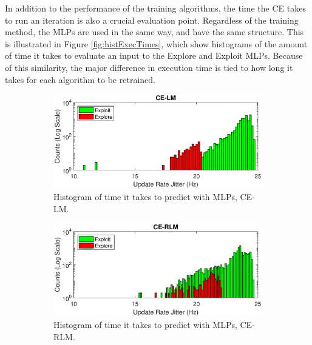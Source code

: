 \par In addition to the performance of the training algorithms, the time the CE takes to run an iteration is also a crucial evaluation point. %
Regardless of the training method, the MLPs are used in the same way, and have the same structure. This is illustrated in Figure \ref{fig:histExecTimes}, which show histograms of the amount of time it takes to evaluate an input to the Explore and Exploit MLPs. Because of this similarity, the major difference in execution time is tied to how long it takes for each algorithm to be retrained. 
\begin{figure}[ht]
\begin{subfigure}{\linewidth}
\centering
\includegraphics[scale=0.7]{figures/flight_results/coop_great_lm_updateRateJitter_log.eps}
\caption{Histogram of time it takes to predict with MLPs, CE-LM.}
\label{fig:flightCoopGreatLMExecTime}
\end{subfigure} 
\begin{subfigure}{\linewidth}
\centering
\includegraphics[scale=0.7]{figures/flight_results/coop_great_rlm_updateRateJitter_log.eps}
\caption{Histogram of time it takes to predict with MLPs, CE-RLM.}
\label{fig:flightCoopGreatLMExecTime}
\end{subfigure}
\begin{subfigure}{\linewidth}

\end{subfigure}
\end{figure}
